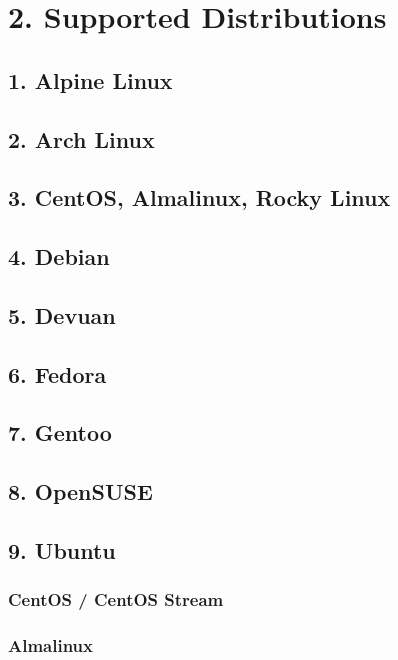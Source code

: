 \section{2. Supported Distributions}

\subsection{1. Alpine Linux}

\subsection{2. Arch Linux}

\subsection{3. CentOS, Almalinux, Rocky Linux}

\subsection{4. Debian}

\subsection{5. Devuan}

\subsection{6. Fedora}

\subsection{7. Gentoo}

\subsection{8. OpenSUSE}

\subsection{9. Ubuntu}

\subsubsection{CentOS / CentOS Stream}

\subsubsection{Almalinux}


